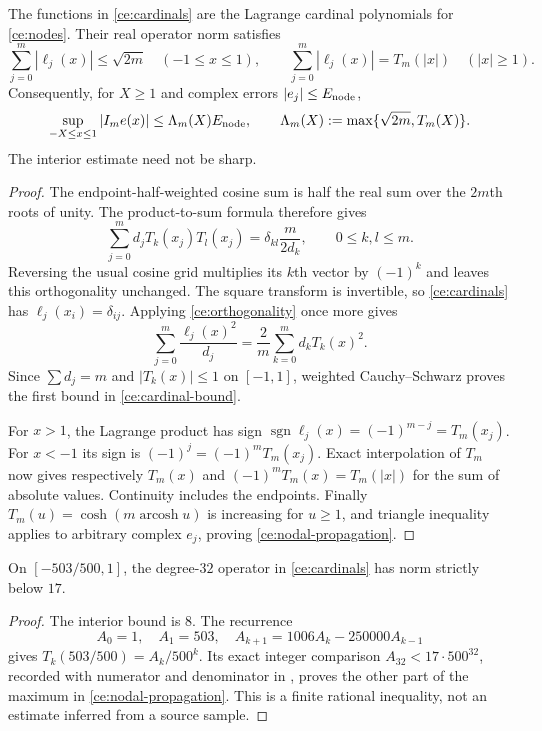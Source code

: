 \begin{theorem}
\label{ce:cardinal-norm}
The functions in \eqref{ce:cardinals} are the Lagrange cardinal
polynomials for \eqref{ce:nodes}. Their real operator norm satisfies
\begin{equation}
 \sum_{j=0}^m|\ell_j(x)|\le\sqrt{2m}\quad(-1\le x\le1),
 \qquad
 \sum_{j=0}^m|\ell_j(x)|=T_m(|x|)\quad(|x|\ge1).
 \label{ce:cardinal-bound}
\end{equation}
Consequently, for $X\ge1$ and complex errors $|e_j|\le E_{\rm node}$,
\begin{equation}
 \sup_{-X\le x\le1}|I_m e(x)|
 \le\Lambda_m(X)E_{\rm node},\qquad
 \Lambda_m(X):=\max\{\sqrt{2m},T_m(X)\}.
 \label{ce:nodal-propagation}
\end{equation}
The interior estimate need not be sharp.
\end{theorem}

\begin{proof}
The endpoint-half-weighted cosine sum is half the real sum over the
$2m$th roots of unity. The product-to-sum formula therefore gives
\begin{equation}
 \sum_{j=0}^m d_jT_k(x_j)T_l(x_j)
 =\delta_{kl}\frac{m}{2d_k},\qquad 0\le k,l\le m.
 \label{ce:orthogonality}
\end{equation}
Reversing the usual cosine grid multiplies its $k$th vector by
$(-1)^k$ and leaves this orthogonality unchanged. The square transform
is invertible, so \eqref{ce:cardinals} has
$\ell_j(x_i)=\delta_{ij}$. Applying \eqref{ce:orthogonality} once more
gives
\[
 \sum_{j=0}^m\frac{\ell_j(x)^2}{d_j}
 =\frac2m\sum_{k=0}^m d_kT_k(x)^2.
\]
Since $\sum d_j=m$ and $|T_k(x)|\le1$ on $[-1,1]$, weighted
Cauchy--Schwarz proves the first bound in \eqref{ce:cardinal-bound}.

For $x>1$, the Lagrange product has sign
$\operatorname{sgn}\ell_j(x)=(-1)^{m-j}=T_m(x_j)$.
For $x<-1$ its sign is $(-1)^j=(-1)^mT_m(x_j)$.
Exact interpolation of $T_m$ now gives respectively $T_m(x)$ and
$(-1)^mT_m(x)=T_m(|x|)$ for the sum of absolute values. Continuity
includes the endpoints. Finally $T_m(u)=\cosh(m\operatorname{arcosh}u)$
is increasing for $u\ge1$, and triangle inequality applies to arbitrary
complex $e_j$, proving \eqref{ce:nodal-propagation}.
\end{proof}

\begin{corollary}
\label{ce:degree32}
On $[-503/500,1]$, the degree-$32$ operator in
\eqref{ce:cardinals} has norm strictly below $17$.
\end{corollary}
\begin{proof}
The interior bound is $8$. The recurrence
\[
 A_0=1,\quad A_1=503,\quad
 A_{k+1}=1006A_k-250000A_{k-1}
\]
gives $T_k(503/500)=A_k/500^k$. Its exact integer comparison
$A_{32}<17\cdot500^{32}$, recorded with numerator and denominator in
\cite{BakerCM45,BakerCMReview39}, proves the other part of the maximum
in \eqref{ce:nodal-propagation}. This is a finite rational inequality,
not an estimate inferred from a source sample.
\end{proof}

